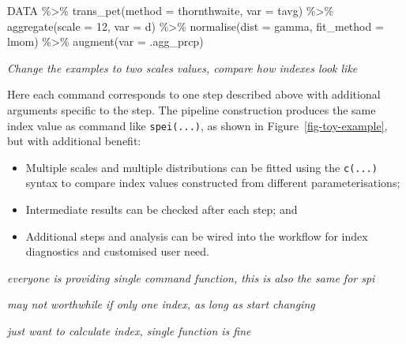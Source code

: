 \documentclass[
  letterpaper,
  DIV=11,
  numbers=noendperiod]{scrartcl}
\newenvironment{Shaded}{\begin{snugshade}}{\end{snugshade}}
\newcommand{\AttributeTok}[1]{\textcolor[rgb]{0.40,0.45,0.13}{#1}}
\newcommand{\DecValTok}[1]{\textcolor[rgb]{0.68,0.00,0.00}{#1}}
\newcommand{\FunctionTok}[1]{\textcolor[rgb]{0.28,0.35,0.67}{#1}}
\newcommand{\NormalTok}[1]{\textcolor[rgb]{0.00,0.23,0.31}{#1}}
\newcommand{\SpecialCharTok}[1]{\textcolor[rgb]{0.37,0.37,0.37}{#1}}
\providecommand{\tightlist}{%
  \setlength{\itemsep}{0pt}\setlength{\parskip}{0pt}}\usepackage{longtable,booktabs,array}
\begin{document}
\begin{Shaded}
\begin{Highlighting}[]
\NormalTok{DATA }\SpecialCharTok{\%\textgreater{}\%} 
  \FunctionTok{trans\_pet}\NormalTok{(}\AttributeTok{method =}\NormalTok{ thornthwaite, }\AttributeTok{var =}\NormalTok{ tavg) }\SpecialCharTok{\%\textgreater{}\%} 
  \FunctionTok{aggregate}\NormalTok{(}\AttributeTok{scale =} \DecValTok{12}\NormalTok{, }\AttributeTok{var =}\NormalTok{ d) }\SpecialCharTok{\%\textgreater{}\%} 
  \FunctionTok{normalise}\NormalTok{(}\AttributeTok{dist =}\NormalTok{ gamma, }\AttributeTok{fit\_method =}\NormalTok{ lmom) }\SpecialCharTok{\%\textgreater{}\%} 
  \FunctionTok{augment}\NormalTok{(}\AttributeTok{var =}\NormalTok{ .agg\_prcp)}
\end{Highlighting}
\end{Shaded}

\emph{Change the examples to two scales values, compare how indexes look
like}

Here each command corresponds to one step described above with
additional arguments specific to the step. The pipeline construction
produces the same index value as command like \texttt{spei(...)}, as
shown in Figure~\ref{fig-toy-example}, but with additional benefit:

\begin{itemize}
\tightlist
\item
  Multiple scales and multiple distributions can be fitted using the
  \texttt{c(...)} syntax to compare index values constructed from
  different parameterisations;
\item
  Intermediate results can be checked after each step; and
\item
  Additional steps and analysis can be wired into the workflow for index
  diagnostics and customised user need.
\end{itemize}

\emph{everyone is providing single command function, this is also the
same for spi}

\emph{may not worthwhile if only one index, as long as start changing}

\emph{just want to calculate index, single function is fine}
\end{document}
